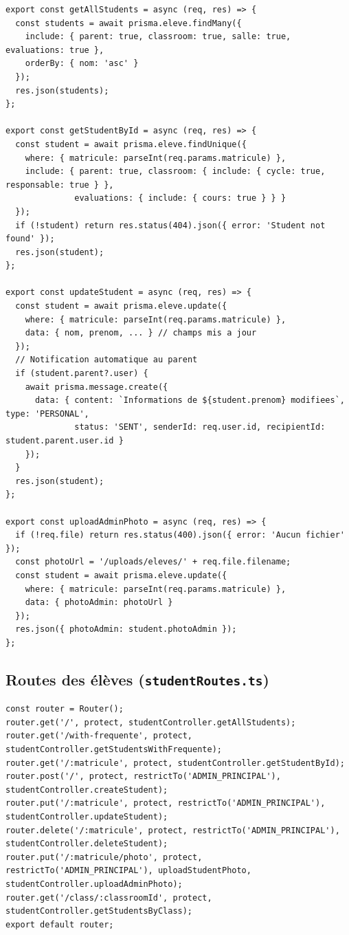 \documentclass[12pt,a4paper]{article}
\begin{document}
\begin{lstlisting}[style=code]
export const getAllStudents = async (req, res) => {
  const students = await prisma.eleve.findMany({
    include: { parent: true, classroom: true, salle: true, evaluations: true },
    orderBy: { nom: 'asc' }
  });
  res.json(students);
};

export const getStudentById = async (req, res) => {
  const student = await prisma.eleve.findUnique({
    where: { matricule: parseInt(req.params.matricule) },
    include: { parent: true, classroom: { include: { cycle: true, responsable: true } },
              evaluations: { include: { cours: true } } }
  });
  if (!student) return res.status(404).json({ error: 'Student not found' });
  res.json(student);
};

export const updateStudent = async (req, res) => {
  const student = await prisma.eleve.update({
    where: { matricule: parseInt(req.params.matricule) },
    data: { nom, prenom, ... } // champs mis a jour
  });
  // Notification automatique au parent
  if (student.parent?.user) {
    await prisma.message.create({
      data: { content: `Informations de ${student.prenom} modifiees`, type: 'PERSONAL',
              status: 'SENT', senderId: req.user.id, recipientId: student.parent.user.id }
    });
  }
  res.json(student);
};

export const uploadAdminPhoto = async (req, res) => {
  if (!req.file) return res.status(400).json({ error: 'Aucun fichier' });
  const photoUrl = '/uploads/eleves/' + req.file.filename;
  const student = await prisma.eleve.update({
    where: { matricule: parseInt(req.params.matricule) },
    data: { photoAdmin: photoUrl }
  });
  res.json({ photoAdmin: student.photoAdmin });
};
\end{lstlisting}

\subsection{Routes des élèves (\texttt{studentRoutes.ts})}

\begin{lstlisting}[style=code]
const router = Router();
router.get('/', protect, studentController.getAllStudents);
router.get('/with-frequente', protect, studentController.getStudentsWithFrequente);
router.get('/:matricule', protect, studentController.getStudentById);
router.post('/', protect, restrictTo('ADMIN_PRINCIPAL'), studentController.createStudent);
router.put('/:matricule', protect, restrictTo('ADMIN_PRINCIPAL'), studentController.updateStudent);
router.delete('/:matricule', protect, restrictTo('ADMIN_PRINCIPAL'), studentController.deleteStudent);
router.put('/:matricule/photo', protect, restrictTo('ADMIN_PRINCIPAL'), uploadStudentPhoto, studentController.uploadAdminPhoto);
router.get('/class/:classroomId', protect, studentController.getStudentsByClass);
export default router;
\end{lstlisting}
\end{document}
